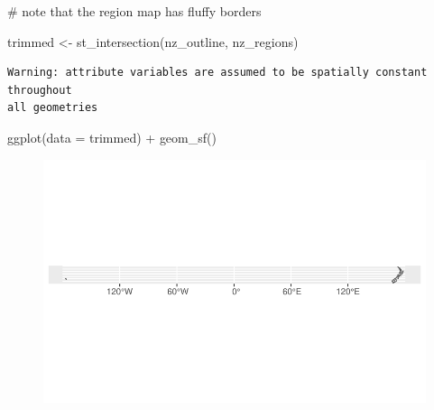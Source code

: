 \documentclass[
  letterpaper,
  DIV=11,
  numbers=noendperiod]{scrartcl}
\newenvironment{Shaded}{\begin{snugshade}}{\end{snugshade}}
\newcommand{\AttributeTok}[1]{\textcolor[rgb]{0.40,0.45,0.13}{#1}}
\newcommand{\CommentTok}[1]{\textcolor[rgb]{0.37,0.37,0.37}{#1}}
\newcommand{\FunctionTok}[1]{\textcolor[rgb]{0.28,0.35,0.67}{#1}}
\newcommand{\NormalTok}[1]{\textcolor[rgb]{0.00,0.23,0.31}{#1}}
\newcommand{\OtherTok}[1]{\textcolor[rgb]{0.00,0.23,0.31}{#1}}
\newcommand{\SpecialCharTok}[1]{\textcolor[rgb]{0.37,0.37,0.37}{#1}}
\begin{document}
\begin{Shaded}
\begin{Highlighting}[]
\CommentTok{\# note that the region map has fluffy borders}
\end{Highlighting}
\end{Shaded}

\begin{Shaded}
\begin{Highlighting}[]
\NormalTok{trimmed }\OtherTok{\textless{}{-}} \FunctionTok{st\_intersection}\NormalTok{(nz\_outline, nz\_regions)}
\end{Highlighting}
\end{Shaded}

\begin{verbatim}
Warning: attribute variables are assumed to be spatially constant throughout
all geometries
\end{verbatim}

\begin{Shaded}
\begin{Highlighting}[]
\FunctionTok{ggplot}\NormalTok{(}\AttributeTok{data =}\NormalTok{ trimmed) }\SpecialCharTok{+}
  \FunctionTok{geom\_sf}\NormalTok{()}
\end{Highlighting}
\end{Shaded}

\begin{figure}[H]

{\centering \includegraphics{Introduction-to-mapping_files/figure-pdf/making tighter map-1.pdf}

}

\end{figure}
\end{document}

